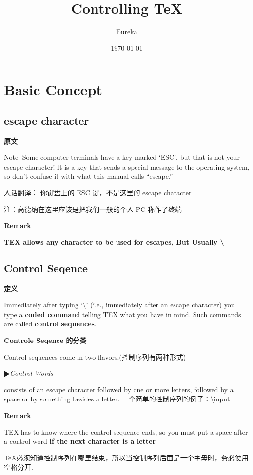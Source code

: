 \documentclass[fontset=windows, 12pt]{article}
\title{Controlling \TeX}
\author{Eureka}
\date{\today}
\newcommand{\trans}[1]{{\ttfamily #1}}
\newcommand{\num}{\ensuremath{\RHD}}
\begin{document}
\maketitle

\section{Basic Concept}
\subsection{escape character}

{\bf 原文}

Note: Some computer terminals have a key marked ‘ESC’, but that is not
your escape character! It is a key that sends a special message to the operating
system, so don’t confuse it with what this manual calls “escape.”

\trans{人话翻译： 你键盘上的 {\ttfamily ESC} 键，不是这里的 {\ttfamily escape character} }

\trans{注：高德纳在这里应该是把我们一般的个人 PC 称作了终端}

\noindent \textbf{Remark}

\textbf{TEX allows any character to be used for escapes, But Usually \textbackslash}

\subsection{Control Seqence}
\textbf{定义} 

Immediately after typing `\textbackslash' (i.e., immediately after an escape character)
you type a {\bf coded comman}d telling TEX what you have in mind. Such commands
are called {\bf control sequences}. 

\textbf{Controle Seqence 的分类}

Control sequences come in two flavors.(控制序列有两种形式)

\num{\itshape Control Words}

consists of an escape character followed by one or more
letters, followed by a space or by something besides a letter. 
一个简单的控制序列的例子：{\ttfamily \textbackslash input }

\textbf{Remark}

TEX has to know
where the control sequence ends, so you must put a space after a 
control word
{\bf if the next character is a letter}

\trans{\TeX 必须知道控制序列在哪里结束，所以当控制序列后面是一个字母时，务必使用空格分开}.
\end{document}
